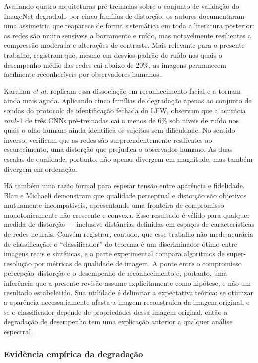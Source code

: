 \documentclass[conference]{IEEEtran}
\begin{document}
Avaliando quatro arquiteturas pré-treinadas sobre o conjunto de validação do ImageNet 
degradado por cinco famílias de distorção, os autores documentaram uma assimetria 
que reaparece de forma sistemática em toda a literatura posterior: as redes são 
muito sensíveis a borramento e ruído, mas notavelmente resilientes a compressão moderada 
e alterações de contraste. Mais relevante para o presente trabalho, registram que, 
mesmo em desvios-padrão de ruído nos quais o desempenho médio das redes cai abaixo de 20\%, 
as imagens permanecem facilmente reconhecíveis por observadores humanos.

Karahan \textit{et al.} \cite{b2} replicam essa dissociação em reconhecimento
facial e a tornam ainda mais aguda. Aplicando cinco famílias de degradação
apenas ao conjunto de sondas do protocolo de identificação fechada do LFW,
observam que a acurácia \textit{rank}-1 de três CNNs pré-treinadas cai a menos
de 6\% sob níveis de ruído nos quais o olho humano ainda identifica os 
sujeitos sem dificuldade. No sentido inverso, verificam que as redes são surpreendentemente 
resilientes ao escurecimento, uma distorção que prejudica o observador humano. As duas escalas 
de qualidade, portanto, não apenas divergem em magnitude, mas também divergem em ordenação.

Há também uma razão formal para esperar tensão entre aparência e fidelidade.
Blau e Michaeli \cite{b3} demonstram que qualidade perceptual e distorção são
objetivos mutuamente incompatíveis, apresentando uma fronteira de compromisso
monotonicamente não crescente e convexa. Esse resultado é válido para qualquer
medida de distorção --- inclusive distâncias definidas em espaços de
características de redes neurais. Convém registrar, contudo, que esse trabalho
não mede acurácia de classificação: o ``classificador'' do teorema é um
discriminador ótimo entre imagens reais e sintéticas, e a parte experimental
compara algoritmos de super-resolução por métricas de qualidade de imagem. A
ponte entre o compromisso percepção--distorção e o desempenho de reconhecimento
é, portanto, uma inferência que a presente revisão assume explicitamente como
hipótese, e não um resultado estabelecido. Sua utilidade é delimitar a
expectativa teórica: se otimizar a aparência necessariamente afasta a imagem
reconstruída da imagem original, e se o classificador depende de propriedades
dessa imagem original, então a degradação de desempenho tem uma explicação
anterior a qualquer análise espectral.

\subsubsection{Evidência empírica da degradação}
\end{document}
